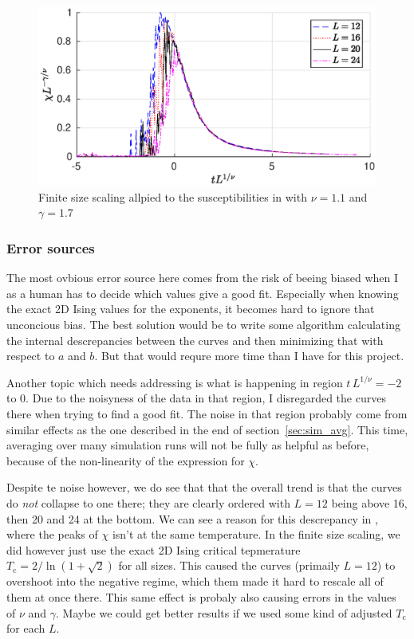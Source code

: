 \documentclass[11pt,letter, swedish, english
]{article}
\newcommand{\Tc}{\ensuremath{T_{\text{c}}}}
\begin{document}
\begin{figure}
\centering
\includegraphics[width=.9\textwidth]{finite-scaling_L-16--24_Nsteps-2048_Nmean-16.eps}
\caption{Finite size scaling allpied to the susceptibilities in
   with $\nu=1.1$ and $\gamma=1.7$}
\label{fig:finite-scaling1}
\end{figure}

\subsubsection{Error sources}
The most ovbious error source here comes from the risk of beeing
biased when I as a human has to decide which values give a good
fit. Especially when knowing the exact 2D Ising values for the
exponents, it becomes hard to ignore that unconcious bias. The best
solution would be to write some algorithm calculating the internal
descrepancies between the curves and then minimizing that with respect
to $a$ and $b$. But that would requre more time than I have for this
project. 

Another topic which needs addressing is what is happening in region
$t\,L^{1/\nu}=-2$ to $0$. Due to the noisyness of the data in that
region, I disregarded the curves there when trying to find a good
fit. 
The noise in that region probably come from similar effects as the one 
described in the end of section~\ref{sec:sim_avg}. This time, averaging
over many simulation runs will not be fully as helpful as before,
because of the non-linearity of the expression for $\chi$.  

Despite te noise however, we do see that that the overall trend
is that the curves do \emph{not} collapse to one there; they are
clearly ordered with $L=12$ being above 16, then 20 and 24 at the
bottom. 
We can see a reason for this descrepancy in , where
the peaks of $\chi$ isn't at the same temperature. In the finite size
scaling, we did however just use the exact 2D Ising critical
tepmerature $\Tc=2/\ln(1+\sqrt2)$ for all sizes. This caused the
curves (primaily $L=12$) to overshoot into the negative regime, which
them made it hard to rescale all of them at once there. This same
effect is probaly also causing errors in the values of $\nu$ and
$\gamma$. Maybe we could get better results if we used some kind of
adjusted $\Tc$ for each $L$. 
\end{document}
